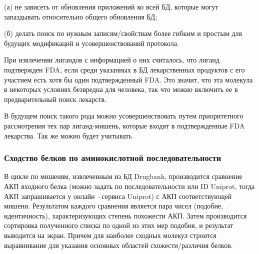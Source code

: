 \documentclass[a4paper,14pt]{article}         %
\begin{document}
(а) не зависеть от обновления приложений ко всей БД, которые могут запаздывать относительно общего обновления БД; 

(б) делать поиск по нужным записям/свойствам более гибким и простым для будущих модификаций и усовершенствований протокола.

При извлечении лигандов с информацией о них считалось, что лиганд подтвержден FDA, если среди указанных в БД лекарственных продуктов с его участием есть хотя бы один подтвержденный FDA. Это значит, что эта молекула в некоторых условиях безвредна для человека, так что можно включить ее в предварительный поиск лекарств. 

В будущем поиск такого рода можно усовершенствовать путем приоритетного рассмотрения тех пар лиганд-мишень, которые входят в подтвержденные FDA лекарства. Так же можно будет учитывать 

\subsubsection{Сходство белков по аминокислотной последовательности}

В цикле по мишеням, извлеченным из БД Drugbank, производится сравнение АКП входного белка (можно задать по последовательности или ID Uniprot, тогда АКП запрашивается у онлайн~--сервиса Uniprot) с АКП соответствующей мишени. Результатом каждого сравнения является пара чисел (подобие, идентичность), характеризующих степень похожести АКП. Затем производится сортировка полученного списка по одной из этих мер подобия, и результат выводится на экран. Причем для наиболее сходных молекул строится выравнивание для указания основных областей схожести/различия белков.
\end{document}
